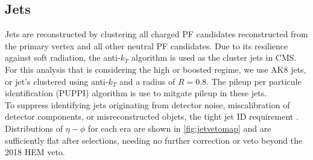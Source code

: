 \subsection{Jets}\label{jets}
Jets are reconstructed by clustering all charged PF candidates reconstructed from the primary vertex and all other neutral PF candidates. Due to its resilience against soft radiation, the anti-$k_T$ \cite{antikt} algorithm is used as the cluster jets in CMS. For this analysis that is considering the high \pt or boosted regime, we use AK8 jets, or jet's clustered using anti-$k_T$ and a radius of $R=0.8$. The pileup per particule identification (PUPPI) \cite{puppi} algorithm is use to mitgate pileup in these jets.\\
To suppress identifying jets originating from detector noise, miscalibration of detector components, or misreconstructed objets, the tight jet ID requirement \cite{jetid}. Distributions of $\eta-\phi$ for each era are shown in \ref{fig:jetvetomap} and are sufficiently flat after selections, needing no further correction or veto beyond the 2018 HEM veto.

